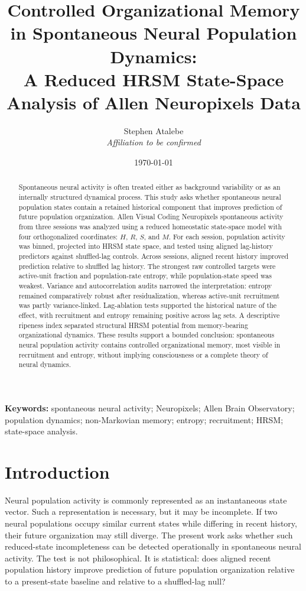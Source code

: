 \documentclass[11pt]{article}
\title{Controlled Organizational Memory in Spontaneous Neural Population Dynamics:\\
A Reduced HRSM State-Space Analysis of Allen Neuropixels Data}
\author{Stephen Atalebe\\
\emph{Affiliation to be confirmed}}
\date{\today}
\begin{document}
\maketitle

\begin{abstract}
Spontaneous neural activity is often treated either as background variability or as an internally structured dynamical process. This study asks whether spontaneous neural population states contain a retained historical component that improves prediction of future population organization. Allen Visual Coding Neuropixels spontaneous activity from three sessions was analyzed using a reduced homeostatic state-space model with four orthogonalized coordinates: \(H\), \(R\), \(S\), and \(M\). For each session, population activity was binned, projected into HRSM state space, and tested using aligned lag-history predictors against shuffled-lag controls. Across sessions, aligned recent history improved prediction relative to shuffled lag history. The strongest raw controlled targets were active-unit fraction and population-rate entropy, while population-state speed was weakest. Variance and autocorrelation audits narrowed the interpretation: entropy remained comparatively robust after residualization, whereas active-unit recruitment was partly variance-linked. Lag-ablation tests supported the historical nature of the effect, with recruitment and entropy remaining positive across lag sets. A descriptive ripeness index separated structural HRSM potential from memory-bearing organizational dynamics. These results support a bounded conclusion: spontaneous neural population activity contains controlled organizational memory, most visible in recruitment and entropy, without implying consciousness or a complete theory of neural dynamics.
\end{abstract}

\noindent\textbf{Keywords:} spontaneous neural activity; Neuropixels; Allen Brain Observatory; population dynamics; non-Markovian memory; entropy; recruitment; HRSM; state-space analysis.

\section{Introduction}

Neural population activity is commonly represented as an instantaneous state vector. Such a representation is necessary, but it may be incomplete. If two neural populations occupy similar current states while differing in recent history, their future organization may still diverge. The present work asks whether such reduced-state incompleteness can be detected operationally in spontaneous neural activity. The test is not philosophical. It is statistical: does aligned recent population history improve prediction of future population organization relative to a present-state baseline and relative to a shuffled-lag null?
\end{document}
